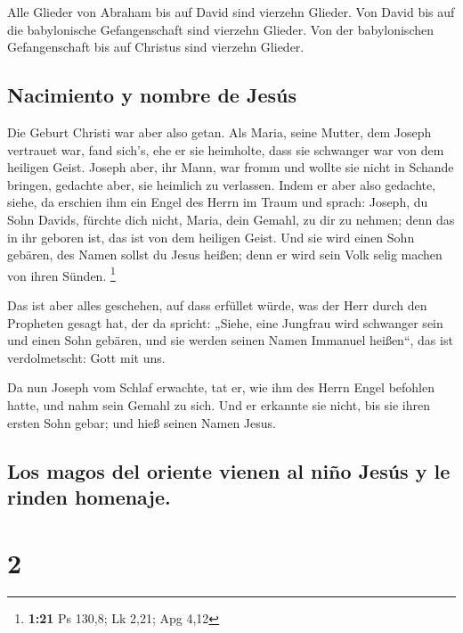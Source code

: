  Alle Glieder von Abraham bis auf David sind vierzehn
Glieder. Von David bis auf die babylonische Gefangenschaft sind vierzehn
Glieder. Von der babylonischen Gefangenschaft bis auf Christus sind
vierzehn Glieder.

\hypertarget{nacimiento-y-nombre-de-jesuxfas}{%
\subsection{Nacimiento y nombre de
Jesús}\label{nacimiento-y-nombre-de-jesuxfas}}

 Die Geburt Christi war aber also getan. Als Maria, seine
Mutter, dem Joseph vertrauet war, fand sich's, ehe er sie heimholte,
dass sie schwanger war von dem heiligen Geist.  Joseph
aber, ihr Mann, war fromm und wollte sie nicht in Schande bringen,
gedachte aber, sie heimlich zu verlassen.  Indem er aber
also gedachte, siehe, da erschien ihm ein Engel des Herrn im Traum und
sprach: Joseph, du Sohn Davids, fürchte dich nicht, Maria, dein Gemahl,
zu dir zu nehmen; denn das in ihr geboren ist, das ist von dem heiligen
Geist.  Und sie wird einen Sohn gebären, des Namen sollst
du Jesus heißen; denn er wird sein Volk selig machen von ihren Sünden.
\footnote{\textbf{1:21} Ps 130,8; Lk 2,21; Apg 4,12}

 Das ist aber alles geschehen, auf dass erfüllet würde,
was der Herr durch den Propheten gesagt hat, der da spricht:
 „Siehe, eine Jungfrau wird schwanger sein und einen Sohn
gebären, und sie werden seinen Namen Immanuel heißen``, das ist
verdolmetscht: Gott mit uns.

 Da nun Joseph vom Schlaf erwachte, tat er, wie ihm des
Herrn Engel befohlen hatte, und nahm sein Gemahl zu sich.
 Und er erkannte sie nicht, bis sie ihren ersten Sohn
gebar; und hieß seinen Namen Jesus.

\hypertarget{los-magos-del-oriente-vienen-al-niuxf1o-jesuxfas-y-le-rinden-homenaje.}{%
\subsection{Los magos del oriente vienen al niño Jesús y le rinden
homenaje.}\label{los-magos-del-oriente-vienen-al-niuxf1o-jesuxfas-y-le-rinden-homenaje.}}

\hypertarget{section-1}{%
\section{2}\label{section-1}}

